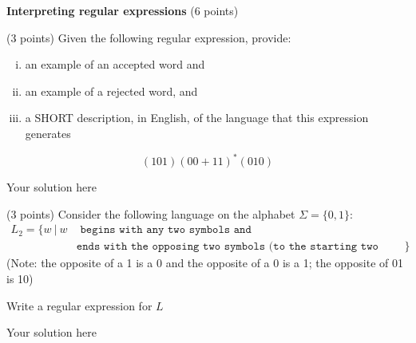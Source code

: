 \documentclass[12pt]{article}
\newenvironment{question}[2][Question]{\begin{trivlist}
\item[\hskip \labelsep {\bfseries #1}\hskip \labelsep {\bfseries #2.}]}{\end{trivlist}}
\newenvironment{solution}[1][Solution:]{\begin{trivlist}
\item[\hskip \labelsep {\bfseries #1}\hskip \labelsep {\bfseries}]\color{blue}}{\end{trivlist}}
\begin{document}
\begin{question}{2}\textbf{Interpreting regular expressions} (6 points)\\
\begin{enumerate}[(a)] 
\item (3 points) Given the following regular expression, provide: 
\begin{enumerate}[(i)] 
\item an example of an accepted word and 
\item an example of a rejected word, and 
\item a SHORT description, in English, of the language that this expression generates
\end{enumerate}
$$(101)(00+11)^{*}(010)$$

    \begin{solution}
       Your solution here
    \end{solution}


\item (3 points) Consider the following language on the alphabet $\Sigma = \{0,1\}$:
\begin{align*}
    L_2 = \{w \ | \ w &\texttt{ begins with any two symbols and }\\
    &\texttt{ends with the opposing two symbols (to the starting two symbols)}\}
\end{align*}
(Note: the opposite of a 1 is a 0 and the opposite of a 0 is a 1; the opposite of 01 is 10)

Write a regular expression for $L$


    \begin{solution}
       Your solution here
    \end{solution}
    
\end{enumerate}
\end{question}

\newpage


\end{document}
